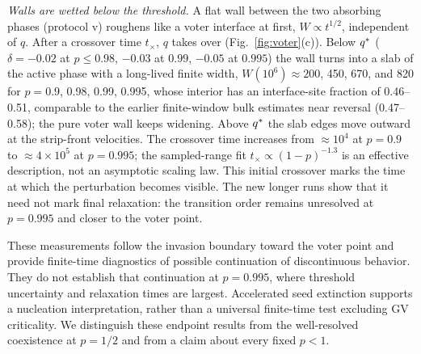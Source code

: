 \textit{Walls are wetted below the threshold.} A flat wall between the two absorbing phases
(protocol v) roughens like a voter interface at first, $W\propto t^{1/2}$, independent of $q$. After
a crossover time $t_\times$, $q$ takes over (Fig.~\ref{fig:voter}(c)). Below $q^{*}$ ($\delta =
-0.02$ at $p\le 0.98$, $-0.03$ at $0.99$, $-0.05$ at $0.995$) the wall turns into a slab of the
active phase with a long-lived finite width, $W(10^6)\approx 200$,
450, 670, and 820 for $p = 0.9$, 0.98, 0.99, 0.995, whose interior has an interface-site
fraction of 0.46--0.51, comparable to the earlier finite-window bulk estimates
near reversal (0.47--0.58); the pure voter wall
keeps widening. Above
$q^{*}$ the slab edges move outward at the strip-front velocities.
The crossover time increases from $\approx10^4$ at $p=0.9$ to
$\approx4\times10^5$ at $p=0.995$; the sampled-range fit
$t_\times\propto(1-p)^{-1.3}$ is an effective description, not an
asymptotic scaling law. This initial crossover marks the time at which
the perturbation becomes visible. The new longer runs show that it need
not mark final relaxation: the transition order remains unresolved at
$p=0.995$ and closer to the voter point.

These measurements follow the invasion boundary toward the voter point
and provide finite-time diagnostics of possible continuation of discontinuous behavior.
They do not establish that continuation at $p=0.995$, where threshold
uncertainty and relaxation times are largest. Accelerated seed extinction
supports a nucleation interpretation, rather than a universal finite-time
test excluding GV criticality. We distinguish these endpoint results from
the well-resolved coexistence at $p=1/2$ and from a claim about every fixed
$p<1$.

